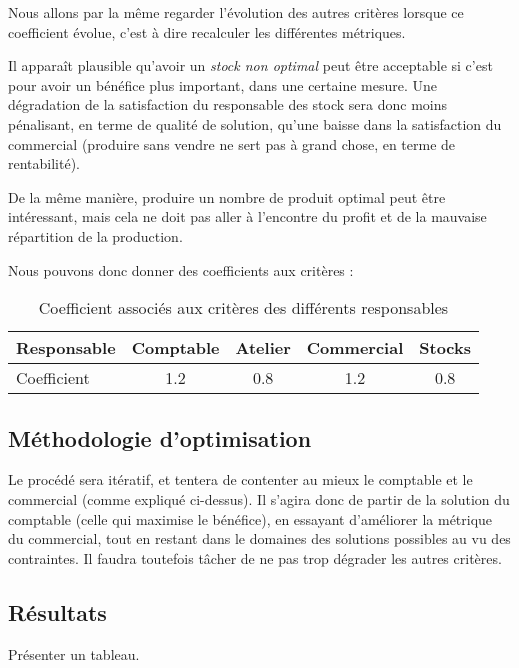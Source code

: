 Nous allons par la même regarder l'évolution des autres critères lorsque ce
coefficient évolue, c'est à dire recalculer les différentes métriques.

Il apparaît plausible qu'avoir un \emph{stock non optimal} peut être acceptable
si c'est pour avoir un bénéfice plus important, dans une certaine mesure. Une
dégradation de la satisfaction du responsable des stock sera donc moins
pénalisant, en terme de qualité de solution, qu'une baisse dans la satisfaction
du commercial (produire sans vendre ne sert pas à grand chose, en terme de
rentabilité).

De la même manière, produire un nombre de produit optimal peut être
intéressant, mais cela ne doit pas aller à l'encontre du profit et de la
mauvaise répartition de la production.

Nous pouvons donc donner des coefficients aux critères :

\begin{table}[h!]
\begin{center}
\begin{tabular}{|l||c|c|c|c|}
\hline
    Responsable & Comptable & Atelier & Commercial & Stocks \\
	\hline
    Coefficient & 1.2	    & 0.8     & 1.2	& 0.8 \\
	\hline
	\end{tabular}
	\end{center}
\caption{Coefficient associés aux critères des différents responsables}
\end{table}

\subsection{Méthodologie d'optimisation}
Le procédé sera itératif, et tentera de contenter au mieux le comptable et le
commercial (comme expliqué ci-dessus). Il s'agira donc de partir de la solution
du comptable (celle qui maximise le bénéfice), en essayant d'améliorer la
métrique du commercial, tout en restant dans le domaines des solutions possibles
au vu des contraintes. Il faudra toutefois tâcher de ne pas trop dégrader les
autres critères.



\subsection{Résultats}
Présenter un tableau.
